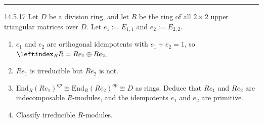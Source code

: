 \documentclass[a4paper, 12pt]{article}
\begin{document}
\noindent\rule{7in}{2.8pt}
\newpage 
\begin{problem}{14.5.17}
Let \(D\) be a division ring, and let \(R\) be the ring of all \(2\times 2\) upper triangular matrices over \(D\). Let \(e_1:=E_{1,1}\) and \(e_2:=E_{2,2}\).
\begin{enumerate}[(1)]
\item \(e_1\) and \(e_2\) are orthogonal idempotents with \(e_1+e_2=1\), so \(\leftindex_R R=Re_1\oplus Re_2\).
\item \(Re_1\) is irreducible but \(Re_2\) is not.
\item \(\text{End}_R(Re_1)^{op}\cong \text{End}_R(Re_2)^{op}\cong D\) as rings. Deduce that \(Re_1\) and \(Re_2\) are indecomposable \(R\)-modules, and the idempotents \(e_1\) and \(e_2\) are primitive.
\item Classify irreducible \(R\)-modules.
\end{enumerate}
\end{problem}
\end{document}
